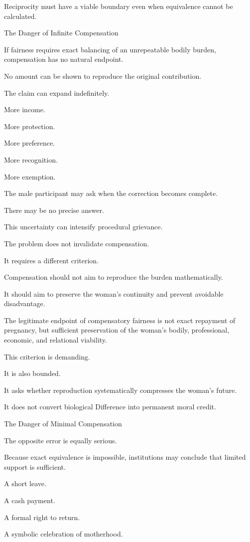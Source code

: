 Reciprocity must have a viable boundary even when equivalence cannot be calculated.

The Danger of Infinite Compensation

If fairness requires exact balancing of an unrepeatable bodily burden, compensation has no natural endpoint.

No amount can be shown to reproduce the original contribution.

The claim can expand indefinitely.

More income.

More protection.

More preference.

More recognition.

More exemption.

The male participant may ask when the correction becomes complete.

There may be no precise answer.

This uncertainty can intensify procedural grievance.

The problem does not invalidate compensation.

It requires a different criterion.

Compensation should not aim to reproduce the burden mathematically.

It should aim to preserve the woman’s continuity and prevent avoidable disadvantage.

The legitimate endpoint of compensatory fairness is not exact repayment of pregnancy, but sufficient preservation of the woman’s bodily, professional, economic, and relational viability.

This criterion is demanding.

It is also bounded.

It asks whether reproduction systematically compresses the woman’s future.

It does not convert biological Difference into permanent moral credit.

The Danger of Minimal Compensation

The opposite error is equally serious.

Because exact equivalence is impossible, institutions may conclude that limited support is sufficient.

A short leave.

A cash payment.

A formal right to return.

A symbolic celebration of motherhood.


